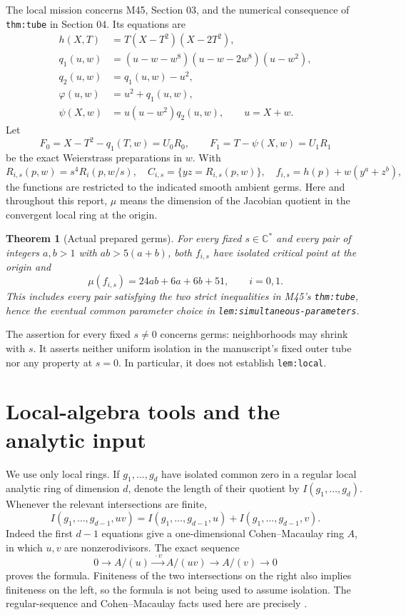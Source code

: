 \documentclass[11pt]{article}
\newtheorem{theorem}{Theorem}
\newcommand{\C}{\mathbb C}
\begin{document}
The local mission concerns M45, Section 03, and the numerical
consequence of \texttt{thm:tube} in Section 04.  Its equations are
\begin{align*}
 h(X,T)&=T(X-T^2)(X-2T^2),\\
 q_1(u,w)&=(u-w-w^8)(u-w-2w^8)(u-w^2),\\
 q_2(u,w)&=q_1(u,w)-u^2,\\
 \varphi(u,w)&=u^2+q_1(u,w),\\
 \psi(X,w)&=u(u-w^2)q_2(u,w),\qquad u=X+w .
\end{align*}
Let
\[
 F_0=X-T^2-q_1(T,w)=U_0R_0,\qquad
 F_1=T-\psi(X,w)=U_1R_1
\]
be the exact Weierstrass preparations in \(w\).  With
\[
 R_{i,s}(p,w)=s^4R_i(p,w/s),\quad
 C_{i,s}=\{yz=R_{i,s}(p,w)\},\quad
 f_{i,s}=h(p)+w(y^a+z^b),
\]
the functions are restricted to the indicated smooth ambient germs.
Here and throughout this report, \(\mu\) means the dimension of the
Jacobian quotient in the convergent local ring at the origin.

\begin{theorem}[Actual prepared germs]\label{thm:actual}
For every fixed \(s\in\C^*\) and every pair of integers \(a,b>1\)
with \(ab>5(a+b)\), both \(f_{i,s}\) have isolated critical point at
the origin and
\[
 \mu(f_{i,s})=24ab+6a+6b+51,\qquad i=0,1.
\]
This includes every pair satisfying the two strict inequalities in
M45's \texttt{thm:tube}, hence the eventual common parameter choice
in \texttt{lem:simultaneous-parameters}.
\end{theorem}

The assertion for every fixed \(s\ne0\) concerns germs: neighborhoods
may shrink with \(s\).  It asserts neither uniform isolation in the
manuscript's fixed outer tube nor any property at \(s=0\).
In particular, it does not establish \texttt{lem:local}.

\section{Local-algebra tools and the analytic input}

We use only local rings.  If \(g_1,\ldots,g_d\) have isolated common
zero in a regular local analytic ring of dimension \(d\), denote the
length of their quotient by \(I(g_1,\ldots,g_d)\).
Whenever the relevant intersections are finite,
\begin{equation}\label{eq:add}
 I(g_1,\ldots,g_{d-1},uv)
 =I(g_1,\ldots,g_{d-1},u)+I(g_1,\ldots,g_{d-1},v).
\end{equation}
Indeed the first \(d-1\) equations give a one-dimensional
Cohen--Macaulay ring \(A\), in which \(u,v\) are nonzerodivisors.
The exact sequence
\[
 0\longrightarrow A/(u)\xrightarrow{\ \cdot v\ }A/(uv)
       \longrightarrow A/(v)\longrightarrow0
\]
proves the formula.  Finiteness of the two intersections on the
right also implies finiteness on the left, so the formula is not
being used to assume isolation.  The regular-sequence and
Cohen--Macaulay facts used here are precisely
\cite[Tags 00NQ and 02JN]{stacks}.
\end{document}

